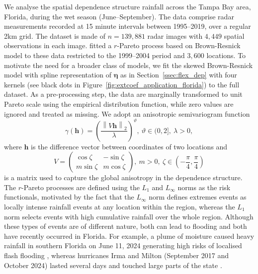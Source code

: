 \documentclass[12pt]{article}
\begin{document}
We analyse the spatial dependence structure rainfall across the Tampa Bay area, Florida, during the wet season (June--September).
The data comprise radar measurements recorded at 15 minute intervals between 1995--2019, over a regular 2km grid. The dataset is made of $n=139,881$ radar images with $4,449$ spatial observations in each image.
%
\cite{deFondeville.Davison:2018} fitted a $r$-Pareto process based on Brown-Resnick model to these data restricted to the 1999--2004 period and $3,600$ locations. 
%
To motivate the need for a broader class of models, we fit the skewed Brown-Resnick model with spline representation of $\bm\eta$ as in Section~\ref{ssec:flex_dep} with four kernels (see black dots in Figure~\ref{fig:extcoef_application_florida}) to the full dataset.
%
As a pre-processing step, the data are marginally transformed to unit Pareto scale using the empirical distribution function, while zero values are ignored and treated as missing. 
%
We adopt an anisotropic semivariogram function
%
\begin{equation}
    \label{eq:semivar}
    \gamma(\bm h) = \left(\frac{\left\| V \bm h\right\|_2}{\lambda}\right)^\vartheta, \:\vartheta\in(0,2],\:\lambda>0,
\end{equation}
%
where $\bm h$ is the difference vector between coordinates of two locations and 
%
\begin{equation*}
\label{eq:aniso_mat}
    V = \begin{pmatrix}
    \cos\zeta & - \sin\zeta\\
    m\sin\zeta &  m\cos\zeta
    \end{pmatrix},\: m >0 , \:\zeta\in (-\frac{\pi}{4},\frac{\pi}{4})
\end{equation*}
is a matrix used to capture the global anisotropy in the dependence structure.
%
The $r$-Pareto processes are defined using the $L_1$ and $L_\infty$ norms as the risk functionals, %
motivated by the fact that the $L_\infty$ norm defines extremes events as locally intense rainfall events at any location within the region, whereas the $L_1$ norm selects events with high cumulative rainfall over the whole region. Although these types of events are of different nature, both can lead to flooding and both have recently occurred in Florida. For example, a plume of moisture caused heavy rainfall in southern Florida on June 11, 2024 generating high risks of localised flash flooding \citep{doermann2024rainfall}, whereas hurricanes Irma and Milton (September 2017 and October 2024) lasted several days and touched large parts of the state \citep{cangialosi2021irma, beven2025milton}. 
\end{document}
